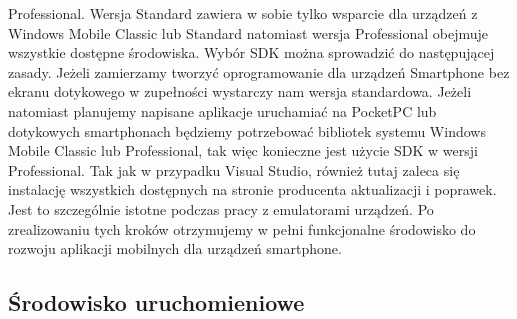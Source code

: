 Professional. Wersja Standard zawiera w sobie tylko wsparcie dla urządzeń z
Windows Mobile Classic lub Standard natomiast wersja Professional obejmuje
wszystkie dostępne środowiska. Wybór SDK można sprowadzić do następującej
zasady. Jeżeli zamierzamy tworzyć oprogramowanie dla urządzeń Smartphone bez
ekranu dotykowego w zupełności wystarczy nam wersja standardowa. Jeżeli
natomiast planujemy napisane aplikacje uruchamiać na PocketPC lub dotykowych
smartphonach będziemy potrzebować bibliotek systemu Windows Mobile Classic lub
Professional, tak więc konieczne jest użycie SDK w wersji Professional. Tak jak
w przypadku Visual Studio, również tutaj zaleca się instalację wszystkich
dostępnych na stronie producenta aktualizacji i poprawek. Jest to szczególnie
istotne podczas pracy z emulatorami urządzeń. Po zrealizowaniu tych kroków
otrzymujemy w pełni funkcjonalne środowisko do rozwoju aplikacji mobilnych dla
urządzeń smartphone.
\subsection{Środowisko uruchomieniowe}
